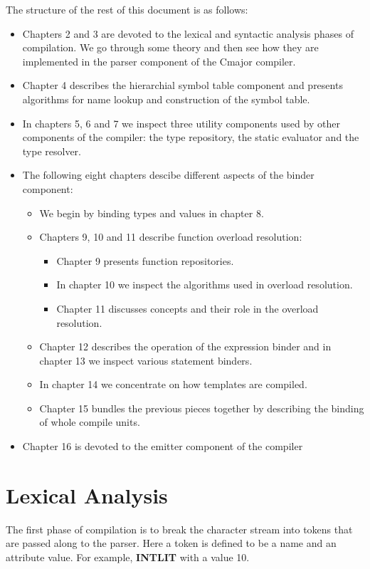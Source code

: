 \documentclass[a4paper,oneside,11pt]{book}
\theoremstyle{definition}
\begin{document}
The structure of the rest of this document is as follows:
\begin{itemize}
\item
Chapters 2 and 3 are devoted to the lexical and syntactic analysis phases of compilation.
We go through some theory and then see how they are implemented in the parser component of the Cmajor compiler.
\item
Chapter 4 describes the hierarchial symbol table component and presents algorithms for name lookup and construction of the symbol table.
\item
In chapters 5, 6 and 7 we inspect three utility components used by other components of the compiler:
the type repository, the static evaluator and the type resolver.
\item
The following eight chapters descibe different aspects of the binder component:
\begin{itemize}
\item
We begin by binding types and values in chapter 8.
\item
Chapters 9, 10 and 11 describe function overload resolution:
\begin{itemize}
\item
Chapter 9 presents function repositories.
\item
In chapter 10 we inspect the algorithms used in overload resolution.
\item
Chapter 11 discusses concepts and their role in the overload resolution.
\end{itemize}
\item
Chapter 12 describes the operation of the expression binder and in chapter 13 we inspect various statement binders.
\item
In chapter 14 we concentrate on how templates are compiled.
\item
Chapter 15 bundles the previous pieces together by describing the binding of whole compile units.
\end{itemize}
\item
Chapter 16 is devoted to the emitter component of the compiler
\end{itemize}

\chapter{Lexical Analysis}

The first phase of compilation is to break the character stream into tokens that are passed along to the parser.
Here a token is defined to be a name and an attribute value.
For example, \textbf{INTLIT} with a value 10.
\end{document}
